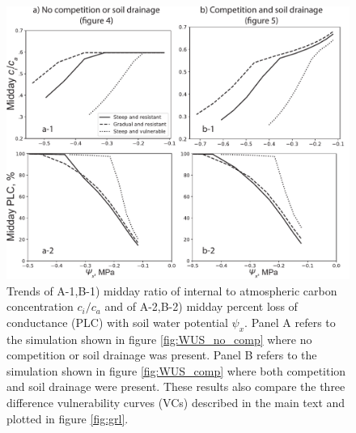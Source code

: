\documentclass[utf8]{frontiersSCNS} %
\begin{document}
\begin{figure}[h]
    \begin{center}
         \includegraphics[scale=0.75]{PLC_cica.pdf}   
    \end{center}
    \caption{Trends of A-1,B-1) midday ratio of internal to atmospheric carbon concentration $c_i / c_a$ and of A-2,B-2) midday percent loss of conductance (PLC) with soil water potential $\psi_x$. Panel A refers to the simulation shown in figure \ref{fig:WUS_no_comp} where no competition or soil drainage was present. Panel B refers to the simulation shown in figure \ref{fig:WUS_comp} where both competition and soil drainage were present. These results also compare the three difference vulnerability curves (VCs) described in the main text and plotted in figure \ref{fig:grl}.} 
    \label{fig:PLC_cica}
\end{figure}
\end{document}
